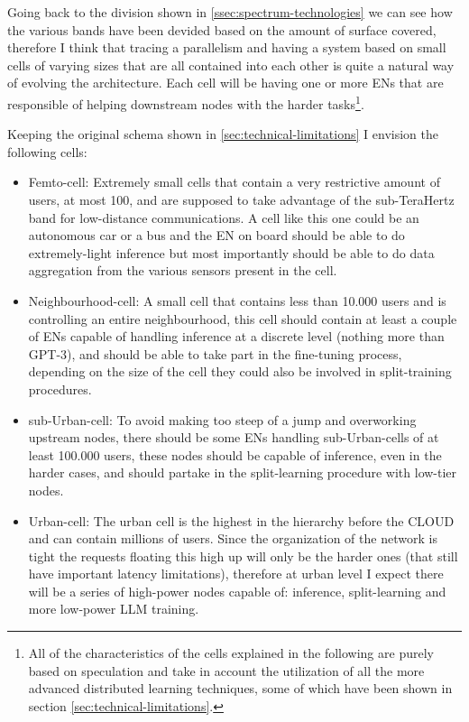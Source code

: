 Going back to the division shown in \ref{ssec:spectrum-technologies} we can see how the various
bands have been devided based on the amount of surface covered, therefore I think that tracing a
parallelism and having a system based on small cells of varying sizes that are all contained into
each other is quite a natural way of evolving the architecture. Each cell will be having one or more
ENs that are responsible of helping downstream nodes with the harder tasks\footnote{All of the
	characteristics of the cells explained in the following are purely based on speculation and take in
	account the utilization of all the more advanced distributed learning techniques, some of which have
	been shown in section \ref{sec:technical-limitations}.}.

Keeping the original schema shown in \ref{sec:technical-limitations} I envision the following cells:
\begin{itemize}
	\item Femto-cell: Extremely small cells that contain a very restrictive amount of users, at
	      most 100, and are supposed to take advantage of the sub-TeraHertz band for low-distance
	      communications. A cell like this one could be an autonomous car or a bus and the EN on board should be able to do extremely-light inference but most importantly should be able to do data aggregation from the various
	      sensors present in the cell.
	\item Neighbourhood-cell: A small cell that contains less than 10.000 users and is
	      controlling an entire neighbourhood, this cell should contain at least a couple of ENs
	      capable of handling inference at a discrete level (nothing more than GPT-3), and should be
	      able to take part in the fine-tuning process, depending on the size of the cell they could
	      also be involved in split-training procedures.
	\item sub-Urban-cell: To avoid making too steep of a jump and overworking upstream nodes,
	      there should be some ENs handling sub-Urban-cells of at least 100.000 users, these nodes
	      should be capable of inference, even in the harder cases, and should partake in the
	      split-learning procedure with low-tier nodes.
	\item Urban-cell: The urban cell is the highest in the hierarchy before the CLOUD and can
	      contain millions of users. Since the organization of the network is tight the requests
	      floating this high up will only be the harder ones (that still have important latency
	      limitations), therefore at urban level I expect there will be a series of high-power nodes
	      capable of: inference, split-learning and more low-power LLM training.
\end{itemize}

